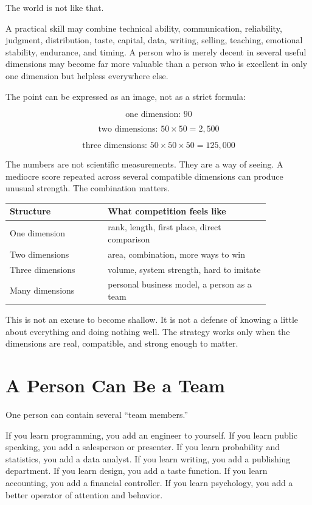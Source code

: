 The world is not like that.

A practical skill may combine technical ability, communication, reliability, judgment, distribution, taste, capital, data, writing, selling, teaching, emotional stability, endurance, and timing. A person who is merely decent in several useful dimensions may become far more valuable than a person who is excellent in only one dimension but helpless everywhere else.

The point can be expressed as an image, not as a strict formula:

\[
\text{one dimension: } 90
\]

\[
\text{two dimensions: } 50 \times 50 = 2{,}500
\]

\[
\text{three dimensions: } 50 \times 50 \times 50 = 125{,}000
\]

The numbers are not scientific measurements. They are a way of seeing. A mediocre score repeated across several compatible dimensions can produce unusual strength. The combination matters.

\begin{center}
\begin{tabular}{p{0.32\linewidth}p{0.53\linewidth}}
\hline
Structure & What competition feels like \\
\hline
One dimension & rank, length, first place, direct comparison \\
Two dimensions & area, combination, more ways to win \\
Three dimensions & volume, system strength, hard to imitate \\
Many dimensions & personal business model, a person as a team \\
\hline
\end{tabular}
\end{center}

This is not an excuse to become shallow. It is not a defense of knowing a little about everything and doing nothing well. The strategy works only when the dimensions are real, compatible, and strong enough to matter.

\section*{A Person Can Be a Team}

One person can contain several ``team members.''

If you learn programming, you add an engineer to yourself. If you learn public speaking, you add a salesperson or presenter. If you learn probability and statistics, you add a data analyst. If you learn writing, you add a publishing department. If you learn design, you add a taste function. If you learn accounting, you add a financial controller. If you learn psychology, you add a better operator of attention and behavior.


